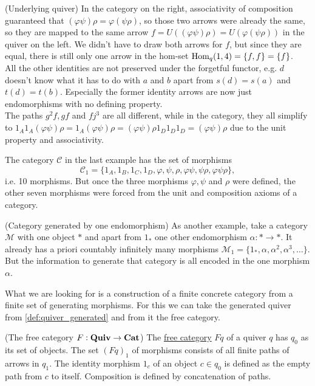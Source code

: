 \begin{example}{(Underlying quiver)}
\noindent In the category on the right, associativity of composition guaranteed that $(\varphi\psi)\rho = \varphi(\psi\rho)$, so those two arrows
were already the same, so they are mapped to the same arrow $f = U((\varphi\psi)\rho) = U(\varphi(\psi\rho))$ in the quiver on the left.
We didn't have to draw both arrows for $f$, but since they are equal, there is still only one arrow in the hom-set $\textup{Hom}_{q}(1,4)=\{f,f\} = \{f\}$.\\
All the other identities are not preserved under the forgetful functor, e.g. $d$ doesn't know what it has to do with $a$ and $b$ apart from
$s(d) = s(a)$ and $t(d) = t(b)$. Especially the former identity arrows are now just endomorphisms with no defining property.\\
The paths $g^{2}f, gf$ and $fj^{3}$ are all different, while in the category, they all simplify to
$1_{A}1_{A}(\varphi\psi)\rho = 1_{A}(\varphi\psi)\rho = (\varphi\psi)\rho1_{D}1_{D}1_{D} =  (\varphi\psi)\rho$ due to the unit property and associativity.
\end{example}

The category $\mathcal{C}$ in the last example has the set of morphisms 
\[
\mathcal{C}_{1} =
\{ 1_{A}, 1_{B}, 1_{C}, 1_{D}, \varphi, \psi, \rho, \varphi\psi, \psi\rho, \varphi\psi\rho \},
\]
i.e. 10 morphisms. But once the three morphisms
$\varphi, \psi$ and $\rho$ were defined, the other seven morphisms were forced from the unit and composition axioms of a category.

\begin{example}{(Category generated by one endomorphism)}\label{ex:category_generated_by_one_endomorphism}
As another example, take a category $\mathcal{M}$ with one object $\ast$ and apart from $1_{\ast}$ one other endomorphism
$\alpha : \ast \rightarrow \ast$. It already has a priori countably infinitely many morphisms
$\mathcal{M}_{1} = \{ 1_{\ast}, \alpha, \alpha^{2}, \alpha^{3}, \dots \}$. But the information to generate that category is all encoded in the
one morphism $\alpha$.
\end{example}

What we are looking for is a construction of a finite concrete category from a finite set of generating morphisms. For this we can take
the generated quiver from \ref{def:quiver_generated} and from it the free category.

\begin{definition}{(The free category $F : \mathrm{\textbf{Quiv}} \rightarrow \mathrm{\textbf{Cat}}$)}\label{def:free_category}
The \ul{free category} $Fq$ of a quiver $q$ has $q_{0}$ as its set of objects. The set $(Fq)_{1}$ of morphisms consists of all finite paths of arrows in
$q_{1}$. The identity morphism $1_{c}$ of an object $c \in q_{0}$ is defined as the empty path from $c$ to itself. Composition is defined by
concatenation of paths.
\end{definition}

